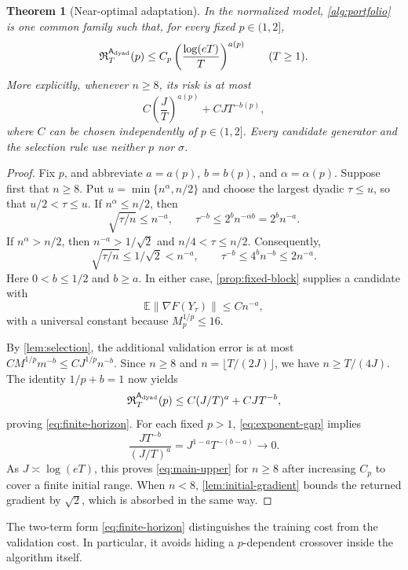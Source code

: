 \documentclass[11pt,a4paper]{article}
\newcommand{\E}{\mathbb{E}}
\newcommand{\norm}[1]{\left\lVert #1\right\rVert}
\newtheorem{theorem}{Theorem}[section]
\theoremstyle{definition}
\theoremstyle{remark}
\begin{document}
\begin{theorem}[Near-optimal adaptation]\label{thm:main-upper}
In the normalized model, \cref{alg:portfolio} is one common family
such that, for every fixed $p\in(1,2]$,
\begin{equation}\label{eq:main-upper}
 \mathfrak R_T^{\mathsf A_{\rm dyad}}(p)
 \le C_p\left(\frac{\log(eT)}{T}\right)^{a(p)}
 \qquad(T\ge1).
\end{equation}
More explicitly, whenever $n\ge8$, its risk is at most
\begin{equation}\label{eq:finite-horizon}
 C\left(\frac JT\right)^{a(p)}+CJT^{-b(p)},
\end{equation}
where $C$ can be chosen independently of $p\in(1,2]$.
Every candidate generator and the selection rule use neither $p$ nor
$\sigma$.
\end{theorem}
\begin{proof}
Fix $p$, and abbreviate $a=a(p)$, $b=b(p)$, and $\alpha=\alpha(p)$.
Suppose first that $n\ge8$. Put
$u=\min\{n^\alpha,n/2\}$ and choose the largest dyadic
$\tau\le u$, so that $u/2<\tau\le u$.
If $n^\alpha\le n/2$, then
\[
 \sqrt{\tau/n}\le n^{-a},\qquad
 \tau^{-b}\le2^b n^{-\alpha b}=2^b n^{-a}.
\]
If $n^\alpha>n/2$, then $n^{-a}>1/\sqrt2$ and
$n/4<\tau\le n/2$. Consequently,
\[
 \sqrt{\tau/n}\le1/\sqrt2<n^{-a},\qquad
 \tau^{-b}\le4^b n^{-b}\le2n^{-a}.
\]
Here $0<b\le1/2$ and $b\ge a$.
In either case, \cref{prop:fixed-block} supplies a candidate with
\begin{equation}\label{eq:good-candidate}
 \E\norm{\nabla F(Y_\tau)}\le Cn^{-a},
\end{equation}
with a universal constant because $M_p^{1/p}\le16$.

By \cref{lem:selection}, the additional validation error is at most
$CM^{1/p}m^{-b}\le CJ^{1/p}n^{-b}$.
Since $n\ge8$ and $n=\lfloor T/(2J)\rfloor$, we have
$n\ge T/(4J)$. The identity $1/p+b=1$ now yields
\[
 \mathfrak R_T^{\mathsf A_{\rm dyad}}(p)
 \le C(J/T)^a+CJT^{-b},
\]
proving \eqref{eq:finite-horizon}.
For each fixed $p>1$, \eqref{eq:exponent-gap} implies
\[
 \frac{JT^{-b}}{(J/T)^a}
 =J^{1-a}T^{-(b-a)}\longrightarrow0.
\]
As $J\asymp\log(eT)$, this proves \eqref{eq:main-upper} for
$n\ge8$ after increasing $C_p$ to cover a finite initial range.
When $n<8$, \cref{lem:initial-gradient} bounds the returned gradient
by $\sqrt2$, which is absorbed in the same way.
\end{proof}

The two-term form \eqref{eq:finite-horizon} distinguishes the training
cost from the validation cost. In particular, it avoids hiding a
$p$-dependent crossover inside the algorithm itself.
\end{document}
